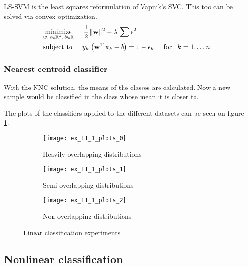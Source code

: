 LS-SVM is the least squares reformulation of Vapnik's SVC.
This too can be solved via convex optimization.
\begin{equation}
\begin{split}
	&\underset{w,\,\epsilon\in\mathbb{R}^d,\,b\in\mathbb{R}}{\operatorname{minimize}}\hspace{5mm}
		\frac{1}{2}\,\lVert\boldsymbol{\mathrm{w}}\rVert^2 + \lambda\,\sum\epsilon^2\\
	&\text{subject to}\hspace{5mm}
		y_k\,\left(\boldsymbol{\mathrm{w}}\textsuperscript{T}\,\boldsymbol{\mathrm{x}}_k + b\right) = 1-\epsilon_k\hspace{5mm}\text{for}\hspace{3mm} k=1,\dots n
\end{split}
\end{equation}

\subsubsection*{Nearest centroid classifier}

With the NNC solution, the means of the classes are calculated.
Now a new sample would be classified in the class whose mean
it is closer to.

The plots of the classifiers applied to the different datasets
can be seen on figure \ref{fig:linear-classification}.

\begin{figure}[H]
	\centering
	\begin{subfigure}{\textwidth}
		\centering
		\texttt{[image: ex\_II\_1\_plots\_0]}
		\caption{Heavily overlapping distributions}
	\end{subfigure}
	\begin{subfigure}{\textwidth}
		\centering
		\texttt{[image: ex\_II\_1\_plots\_1]}
		\caption{Semi-overlapping distributions}
	\end{subfigure}
	\begin{subfigure}{\textwidth}
		\centering
		\texttt{[image: ex\_II\_1\_plots\_2]}
		\caption{Non-overlapping distributions}
	\end{subfigure}
	\caption{Linear classification experiments}
	\label{fig:linear-classification}
\end{figure}


\subsection{Nonlinear classification}

